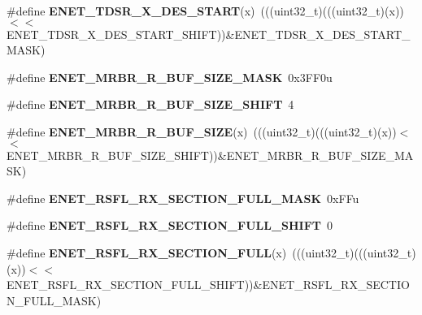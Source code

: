 \begin{DoxyCompactItemize}
\item 
\#define {\bfseries E\+N\+E\+T\+\_\+\+T\+D\+S\+R\+\_\+\+X\+\_\+\+D\+E\+S\+\_\+\+S\+T\+A\+RT}(x)~(((uint32\+\_\+t)(((uint32\+\_\+t)(x))$<$$<$E\+N\+E\+T\+\_\+\+T\+D\+S\+R\+\_\+\+X\+\_\+\+D\+E\+S\+\_\+\+S\+T\+A\+R\+T\+\_\+\+S\+H\+I\+FT))\&E\+N\+E\+T\+\_\+\+T\+D\+S\+R\+\_\+\+X\+\_\+\+D\+E\+S\+\_\+\+S\+T\+A\+R\+T\+\_\+\+M\+A\+SK)\hypertarget{group__ENET__Register__Masks_ga53841baf2c5ce76e02763f85cb9bca43}{}\label{group__ENET__Register__Masks_ga53841baf2c5ce76e02763f85cb9bca43}

\item 
\#define {\bfseries E\+N\+E\+T\+\_\+\+M\+R\+B\+R\+\_\+\+R\+\_\+\+B\+U\+F\+\_\+\+S\+I\+Z\+E\+\_\+\+M\+A\+SK}~0x3\+F\+F0u\hypertarget{group__ENET__Register__Masks_ga376edb2860d9c55545ca78616f7d81f3}{}\label{group__ENET__Register__Masks_ga376edb2860d9c55545ca78616f7d81f3}

\item 
\#define {\bfseries E\+N\+E\+T\+\_\+\+M\+R\+B\+R\+\_\+\+R\+\_\+\+B\+U\+F\+\_\+\+S\+I\+Z\+E\+\_\+\+S\+H\+I\+FT}~4\hypertarget{group__ENET__Register__Masks_ga97d12f7cd393b851484d3bbdcd4614b2}{}\label{group__ENET__Register__Masks_ga97d12f7cd393b851484d3bbdcd4614b2}

\item 
\#define {\bfseries E\+N\+E\+T\+\_\+\+M\+R\+B\+R\+\_\+\+R\+\_\+\+B\+U\+F\+\_\+\+S\+I\+ZE}(x)~(((uint32\+\_\+t)(((uint32\+\_\+t)(x))$<$$<$E\+N\+E\+T\+\_\+\+M\+R\+B\+R\+\_\+\+R\+\_\+\+B\+U\+F\+\_\+\+S\+I\+Z\+E\+\_\+\+S\+H\+I\+FT))\&E\+N\+E\+T\+\_\+\+M\+R\+B\+R\+\_\+\+R\+\_\+\+B\+U\+F\+\_\+\+S\+I\+Z\+E\+\_\+\+M\+A\+SK)\hypertarget{group__ENET__Register__Masks_ga236137ed06ec6b5e9bab8e945351da71}{}\label{group__ENET__Register__Masks_ga236137ed06ec6b5e9bab8e945351da71}

\item 
\#define {\bfseries E\+N\+E\+T\+\_\+\+R\+S\+F\+L\+\_\+\+R\+X\+\_\+\+S\+E\+C\+T\+I\+O\+N\+\_\+\+F\+U\+L\+L\+\_\+\+M\+A\+SK}~0x\+F\+Fu\hypertarget{group__ENET__Register__Masks_ga415bf81c3a615e8ee3c7cd5dddc5a9a2}{}\label{group__ENET__Register__Masks_ga415bf81c3a615e8ee3c7cd5dddc5a9a2}

\item 
\#define {\bfseries E\+N\+E\+T\+\_\+\+R\+S\+F\+L\+\_\+\+R\+X\+\_\+\+S\+E\+C\+T\+I\+O\+N\+\_\+\+F\+U\+L\+L\+\_\+\+S\+H\+I\+FT}~0\hypertarget{group__ENET__Register__Masks_ga8d10ff4a7b7abbe2f089ccc4dddcdd46}{}\label{group__ENET__Register__Masks_ga8d10ff4a7b7abbe2f089ccc4dddcdd46}

\item 
\#define {\bfseries E\+N\+E\+T\+\_\+\+R\+S\+F\+L\+\_\+\+R\+X\+\_\+\+S\+E\+C\+T\+I\+O\+N\+\_\+\+F\+U\+LL}(x)~(((uint32\+\_\+t)(((uint32\+\_\+t)(x))$<$$<$E\+N\+E\+T\+\_\+\+R\+S\+F\+L\+\_\+\+R\+X\+\_\+\+S\+E\+C\+T\+I\+O\+N\+\_\+\+F\+U\+L\+L\+\_\+\+S\+H\+I\+FT))\&E\+N\+E\+T\+\_\+\+R\+S\+F\+L\+\_\+\+R\+X\+\_\+\+S\+E\+C\+T\+I\+O\+N\+\_\+\+F\+U\+L\+L\+\_\+\+M\+A\+SK)\hypertarget{group__ENET__Register__Masks_ga8fab46c0b08cc69ffba1bdce893dc57e}{}\label{group__ENET__Register__Masks_ga8fab46c0b08cc69ffba1bdce893dc57e}


\end{DoxyCompactItemize}
